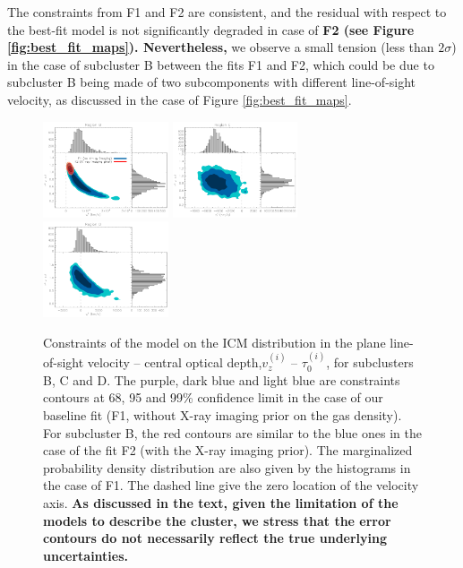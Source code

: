 \documentclass[twocolumn,traditabstract]{aa}
\begin{document}
The constraints from F1 and F2 are consistent, and the residual with respect to the best-fit model is not significantly degraded in case of {\bf F2 (see Figure \ref{fig:best_fit_maps}). Nevertheless,} we observe a small tension (less than $2 \sigma$) in the case of subcluster B between the fits F1 and F2, which could be due to subcluster B being made of two subcomponents with different line-of-sight velocity, as discussed in the case of Figure \ref{fig:best_fit_maps}.
\begin{figure}[h]
\centering
\includegraphics[width=0.33\textwidth]{Figure/Tau_vz_2dLikelihoods_B.pdf}
\includegraphics[width=0.33\textwidth]{Figure/Tau_vz_2dLikelihoods_C.pdf}
\includegraphics[width=0.33\textwidth]{Figure/Tau_vz_2dLikelihoods_D.pdf}
\caption{\footnotesize{Constraints of the model on the ICM distribution in the plane line-of-sight velocity -- central optical depth,$v_z^{(i)}$ -- $\tau_0^{(i)}$, for subclusters B, C and D. The purple, dark blue and light blue are constraints contours at 68, 95 and 99\% confidence limit in the case of our baseline fit (F1, without X-ray imaging prior on the gas density). For subcluster B, the red contours are similar to the blue ones in the case of the fit F2 (with the X-ray imaging prior). The marginalized probability density distribution are also given by the histograms in the case of F1. The dashed line give the zero location of the velocity axis. {\bf As discussed in the text, given the limitation of the models to describe the cluster, we stress that the error contours do not necessarily reflect the true underlying uncertainties.}}}
\label{fig:velocity_constraint}
\end{figure}
\end{document}
